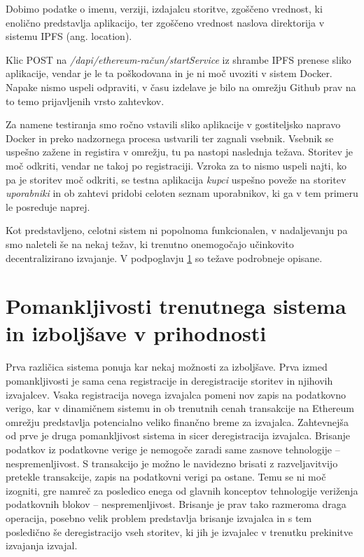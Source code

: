 \documentclass[a4paper, 12pt]{book}
\begin{document}
Dobimo podatke o imenu, verziji, izdajalcu storitve, zgoščeno vrednost, ki enolično predstavlja aplikacijo, ter zgoščeno vrednost naslova direktorija v sistemu IPFS (ang. location).

Klic POST na \textit{/dapi/{ethereum-račun}/startService} iz shrambe IPFS prenese sliko aplikacije, vendar je le ta poškodovana in je ni moč uvoziti v sistem Docker.
Napake nismo uspeli odpraviti, v času izdelave je bilo na omrežju Github prav na to temo prijavljenih vrsto zahtevkov.

Za namene testiranja smo ročno vstavili sliko aplikacije v gostiteljsko napravo Docker in preko nadzornega procesa ustvarili ter zagnali vsebnik.
Vsebnik se uspešno zažene in registira v omrežju, tu pa nastopi naslednja težava.
Storitev je moč odkriti, vendar ne takoj po registraciji.
Vzroka za to nismo uspeli najti, ko pa je storitev moč odkriti, se testna aplikacija \textit{kupci} uspešno poveže na storitev \textit{uporabniki} in ob zahtevi pridobi celoten seznam uporabnikov, ki ga v tem primeru le posreduje naprej.

Kot predstavljeno, celotni sistem ni popolnoma funkcionalen, v nadaljevanju pa smo naleteli še na nekaj težav, ki trenutno onemogočajo učinkovito decentralizirano izvajanje.
V podpoglavju \ref{improvments} so težave podrobneje opisane.


\section{Pomankljivosti trenutnega sistema in izboljšave v prihodnosti}
\label{improvments}

Prva različica sistema ponuja kar nekaj možnosti za izboljšave.
Prva izmed pomankljivosti je sama cena registracije in deregistracije storitev in njihovih izvajalcev.
Vsaka registracija novega izvajalca pomeni nov zapis na podatkovno verigo, kar v dinamičnem sistemu in ob trenutnih cenah transakcije na Ethereum omrežju predstavlja potencialno veliko finančno breme za izvajalca.
Zahtevnejša od prve je druga pomankljivost sistema in sicer deregistracija izvajalca.
Brisanje podatkov iz podatkovne verige je nemogoče zaradi same zasnove tehnologije -- nespremenljivost.
S transakcijo je možno le navidezno brisati z razveljavitvijo pretekle transakcije, zapis na podatkovni verigi pa ostane.
Temu se ni moč izogniti, gre namreč za posledico enega od glavnih konceptov tehnologije veriženja podatkovnih blokov -- nespremenljivost.
Brisanje je prav tako razmeroma draga operacija, posebno velik problem predstavlja brisanje izvajalca in s tem posledično še deregistracijo vseh storitev, ki jih je izvajalec v trenutku prekinitve izvajanja izvajal.
\end{document}
